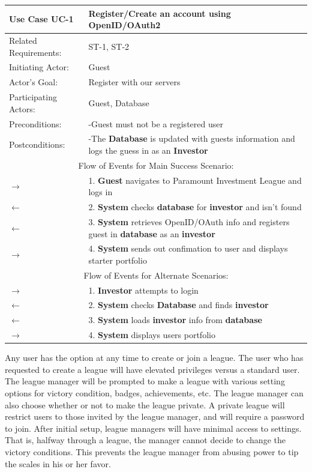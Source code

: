 \begin{centering}
\renewcommand\arraystretch{1.3} %
\label{UC-1}
\begin{longtable}{|p{1.2in} p{5in}|}

\hline
\bfseries{\color{color1}Use Case UC-1} &
\bfseries{\color{color1}Register/Create an account using OpenID/OAuth2} \\
\hline
Related Requirements: & ST-1, ST-2 \\
Initiating Actor:     & Guest \\
Actor's Goal:         & Register with our servers\\
Participating Actors: & Guest, Database\\
Preconditions:        & -Guest must not be a registered user\\
Postconditions:       & -The \textbf{Database} is updated with guests information and
                         logs the guess in as an \textbf{Investor}\\
\hline
\multicolumn{2}{|c|}{\color{color1}Flow of Events for Main Success Scenario:}\\
\hline
$\rightarrow$ & 1. \textbf{Guest} navigates to Paramount Investment League and logs in \\
 $\leftarrow$ & 2. \textbf{System} checks \textbf{database} for \textbf{investor} and
isn't found\\
 $\leftarrow$ & 3. \textbf{System} retrieves OpenID/OAuth info and registers guest
in \textbf{database} as an \textbf{investor}\\
$\rightarrow$ & 4. \textbf{System} sends out confimation to user and displays starter
portfolio \\
\hline
\multicolumn{2}{|c|}{\color{color1}Flow of Events for Alternate Scenarios:} \\
\hline
$\rightarrow$ & 1.  \textbf{Investor} attempts to login  \\
 $\leftarrow$ & 2. \textbf{System} checks \textbf{Database} and finds \textbf{investor}\\
 $\leftarrow$ & 3. \textbf{System} loads \textbf{investor} info from \textbf{database} \\
$\rightarrow$ & 4. \textbf{System} displays users portfolio \\
\hline
\end{longtable}
\end{centering}

Any user has the option at any time to create or join a league. The user who has requested
to create a league will have elevated privileges versus a standard user. The league manager
will be prompted to make a league with various setting options for victory condition, badges,
achievements, etc. The league manager can also choose whether or not to make the league private.
A private league will restrict users to those invited by the league manager, and will require
a password to join. After initial setup, league managers will have minimal access to settings.
That is, halfway through a league, the manager cannot decide to change the victory conditions.
This prevents the league manager from abusing power to tip the scales in his or her favor.\\

